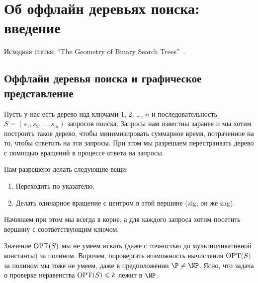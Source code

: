 \section{Об оффлайн деревьях поиска: введение}

Исходная статья: ``The Geometry of Binary Search Trees''~\cite{demaine2009geometry}.

\subsection{Оффлайн деревья поиска и графическое представление}

Пусть у нас есть дерево над ключами $1$, $2$, \ldots, $n$ и последовательность $S = (s_1, s_2, \ldots, s_m)$ запросов поиска. Запросы нам известны заранее и мы хотим построить такое дерево, чтобы минимизировать суммарное время, потраченное на то, чтобы ответить на эти запросы. 
При этом мы разрешаем перестраивать дерево с помощью вращений в процессе 
ответа на запросы.

Нам разрешено делать следующие вещи:
\begin{enumerate}
\item Переходить по указателю.
\item Делать одинарное вращение с центром в этой вершине (zig, он же zag).
\end{enumerate}

Начинаем при этом мы всегда в корне, а для каждого запроса хотим посетить вершину
с соответствующим ключом.




Значение 
$\operatorname{OPT}(S)$ мы не умеем искать (даже с точностью до мультипликативной
константы) за полином. Впрочем, опровергать возможность вычисления $\operatorname{OPT}(S)$ 
за полином мы тоже не умеем, даже в предположении $\P \neq \NP$. Ясно,
что задача о проверке неравенства $\operatorname{OPT}(S) \leqslant k$ лежит в $\NP$.

